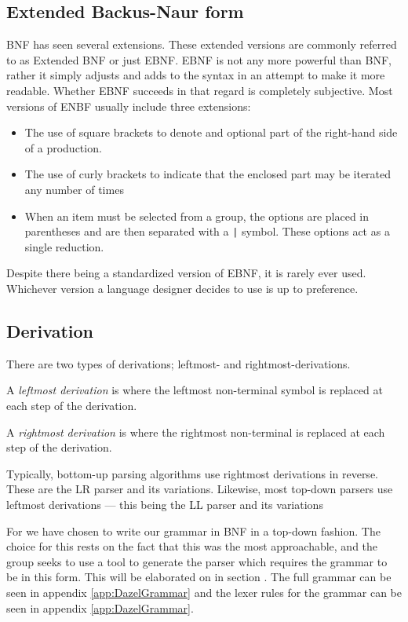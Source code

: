 \subsection{Extended Backus-Naur form}

BNF has seen several extensions.
These extended versions are commonly referred to as Extended BNF or just EBNF.
EBNF is not any more powerful than BNF, rather it simply adjusts and adds to the syntax in an attempt to make it more readable.
Whether EBNF succeeds in that regard is completely subjective.
Most versions of ENBF usually include three extensions:
\begin{itemize}
    \item The use of square brackets to denote and optional part of the right-hand side of a production.
    \item The use of curly brackets to indicate that the enclosed part may be iterated any number of times
    \item When an item must be selected from a group, the options are placed in parentheses and are then separated with a \texttt{|} symbol. These options act as a single reduction.
\end{itemize}

Despite there being a standardized version of EBNF, it is rarely ever used. Whichever version a language designer decides to use is up to preference\cite{sebesta_concepts_2016}.

\subsection*{Derivation}

There are two types of derivations; leftmost- and rightmost-derivations\cite{sebesta_concepts_2016}.

A \textit{leftmost derivation} is where the leftmost non-terminal symbol is replaced at each step of the derivation.

A \textit{rightmost derivation} is where the rightmost non-terminal is replaced at each step of the derivation.

Typically, bottom-up parsing algorithms use rightmost derivations in reverse. These are the LR parser and its variations. Likewise, most top-down parsers use leftmost derivations — this being the LL parser and its variations

For \dazel{} we have chosen to write our grammar in BNF in a top-down fashion. The choice for this rests on the fact that this was the most approachable, and the group seeks to use a tool to generate the parser which requires the grammar to be in this form. This will be elaborated on in section . The full grammar can be seen in appendix \ref{app:DazelGrammar} and the lexer rules for the grammar can be seen in appendix \ref{app:DazelGrammar}.
